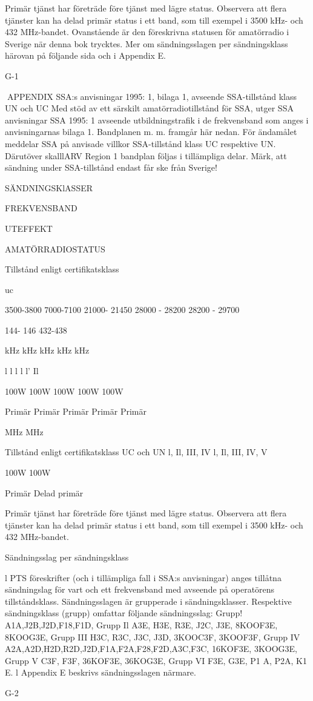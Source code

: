 Primär tjänst har företräde före tjänst med lägre status. Observera att flera tjänster kan ha
delad primär status i ett band, som till exempel i 3500 kHz- och 432 MHz-bandet.
Ovanstående är den föreskrivna statusen för amatörradio i Sverige när denna bok trycktes.
Mer om sändningsslagen per sändningsklass härovan på följande sida och i Appendix E.

G-1

APPENDIX
SSA:s anvisningar 1995: 1, bilaga 1, avseende SSA-tillstånd klass UN och UC
Med stöd av ett särskilt amatörradiotillstånd för SSA, utger SSA anvisningar SSA 1995: 1
avseende utbildningstrafik i de frekvensband som anges i anvisningarnas bilaga 1. Bandplanen m. m. framgår här nedan.
För ändamålet meddelar SSA på anvisade villkor SSA-tillstånd klass UC respektive UN.
Därutöver skalllARV Region 1 bandplan följas i tillämpliga delar.
Märk, att sändning under SSA-tillstånd endast får ske från Sverige!

SÄNDNINGSKlASSER

FREKVENSBAND

UTEFFEKT

AMATÖRRADIOSTATUS

Tillstånd enligt
certifikatsklass

uc

3500-3800
7000-7100
21000- 21450
28000 - 28200
28200 - 29700

144- 146
432-438

kHz
kHz
kHz
kHz
kHz

l
l
l
l
l' Il

100W
100W
100W
100W
100W

Primär
Primär
Primär
Primär
Primär

MHz
MHz

Tillstånd enligt
certifikatsklass
UC och UN
l, Il, III, IV
l, Il, III, IV, V

100W
100W

Primär
Delad primär

Primär tjänst har företräde före tjänst med lägre status. Observera att flera tjänster kan ha
delad primär status i ett band, som till exempel i 3500 kHz- och 432 MHz-bandet.

Sändningsslag per sändningsklass

l PTS föreskrifter (och i tillämpliga fall i SSA:s anvisningar) anges tillåtna sändningslag för
vart och ett frekvensband med avseende på operatörens tillståndsklass. Sändningsslagen
är grupperade i sändningsklasser.
Respektive sändningsklass (grupp) omfattar följande sändningsslag:
Grupp!
A1A,J2B,J2D,F18,F1D,
Grupp Il
A3E, H3E, R3E, J2C, J3E, 8KOOF3E, 8KOOG3E,
Grupp III
H3C, R3C, J3C, J3D, 3KOOC3F, 3KOOF3F,
Grupp IV
A2A,A2D,H2D,R2D,J2D,F1A,F2A,F28,F2D,A3C,F3C, 16KOF3E,
3KOOG3E,
Grupp V
C3F, F3F, 36KOF3E, 36KOG3E,
Grupp VI
F3E, G3E, P1 A, P2A, K1 E.
l Appendix E beskrivs sändningsslagen närmare.

G-2
